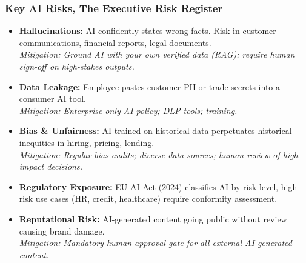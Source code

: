 \begin{frame}[fragile]\frametitle{Key AI Risks, The Executive Risk Register}

\begin{itemize}
  \item \textbf{Hallucinations:} AI confidently states wrong facts. Risk in customer communications, financial reports, legal documents.\\
    \textit{Mitigation: Ground AI with your own verified data (RAG); require human sign-off on high-stakes outputs.}
  \item \textbf{Data Leakage:} Employee pastes customer PII or trade secrets into a consumer AI tool.\\
    \textit{Mitigation: Enterprise-only AI policy; DLP tools; training.}
  \item \textbf{Bias \& Unfairness:} AI trained on historical data perpetuates historical inequities in hiring, pricing, lending.\\
    \textit{Mitigation: Regular bias audits; diverse data sources; human review of high-impact decisions.}
  \item \textbf{Regulatory Exposure:} EU AI Act (2024) classifies AI by risk level, high-risk use cases (HR, credit, healthcare) require conformity assessment.
  \item \textbf{Reputational Risk:} AI-generated content going public without review causing brand damage.\\
    \textit{Mitigation: Mandatory human approval gate for all external AI-generated content.}
\end{itemize}

\end{frame}

